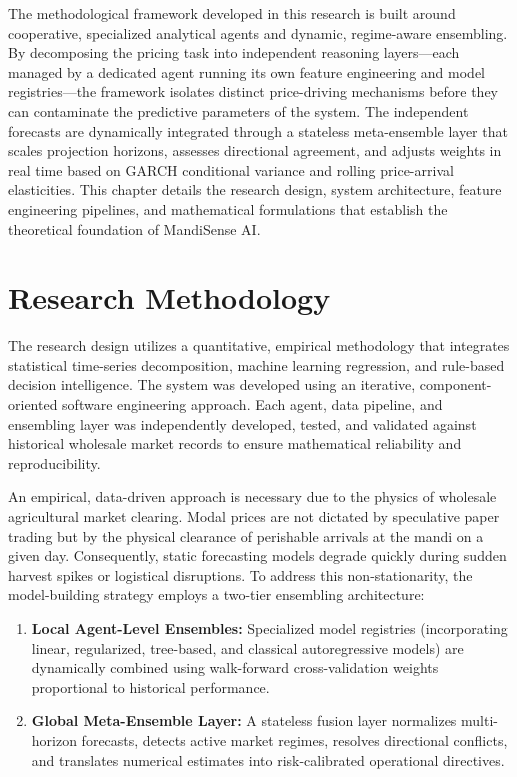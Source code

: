 \documentclass[12pt,a4paper]{report}
\theoremstyle{definition}
\theoremstyle{remark}
\begin{document}
The methodological framework developed in this research is built around cooperative, specialized analytical agents and dynamic, regime-aware ensembling. By decomposing the pricing task into independent reasoning layers—each managed by a dedicated agent running its own feature engineering and model registries—the framework isolates distinct price-driving mechanisms before they can contaminate the predictive parameters of the system. The independent forecasts are dynamically integrated through a stateless meta-ensemble layer that scales projection horizons, assesses directional agreement, and adjusts weights in real time based on GARCH conditional variance and rolling price-arrival elasticities. This chapter details the research design, system architecture, feature engineering pipelines, and mathematical formulations that establish the theoretical foundation of MandiSense AI.

\section{Research Methodology}

The research design utilizes a quantitative, empirical methodology that integrates statistical time-series decomposition, machine learning regression, and rule-based decision intelligence. The system was developed using an iterative, component-oriented software engineering approach. Each agent, data pipeline, and ensembling layer was independently developed, tested, and validated against historical wholesale market records to ensure mathematical reliability and reproducibility.

An empirical, data-driven approach is necessary due to the physics of wholesale agricultural market clearing. Modal prices are not dictated by speculative paper trading but by the physical clearance of perishable arrivals at the mandi on a given day. Consequently, static forecasting models degrade quickly during sudden harvest spikes or logistical disruptions. To address this non-stationarity, the model-building strategy employs a two-tier ensembling architecture:
\begin{enumerate}
    \item \textbf{Local Agent-Level Ensembles:} Specialized model registries (incorporating linear, regularized, tree-based, and classical autoregressive models) are dynamically combined using walk-forward cross-validation weights proportional to historical performance.
    \item \textbf{Global Meta-Ensemble Layer:} A stateless fusion layer normalizes multi-horizon forecasts, detects active market regimes, resolves directional conflicts, and translates numerical estimates into risk-calibrated operational directives.
\end{enumerate}
\end{document}
